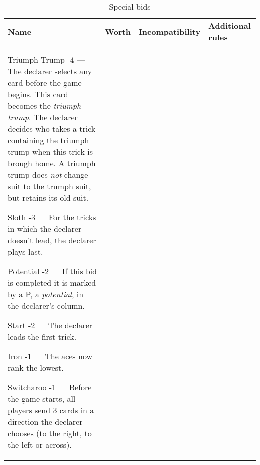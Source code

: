 %
%
%
%

\newcommand{\nonTrump}{\textnormal{non-trump bids}}

\begin{table}
	\caption{Special bids}\label{tab:specialBids}
	\begin{center}
		\begin{tabularx}{\textwidth}{
			l
			S[table-number-alignment=center, table-figures-decimal=0]
			p{3cm}
			|X
		}
			\textbf{Name} &
			\textbf{Worth} &
			\textbf{Incompatibility} &
			\textbf{Additional rules}
			\\[-3ex]

			\specialBidItem%
			{Triumph Trump}
			{-4}
			{---}
			{%
				The declarer selects any card before the game begins. This card becomes the \emph{triumph trump}. The declarer decides who takes a trick containing the triumph trump when this trick is brough home. A triumph trump does \emph{not} change suit to the trumph suit, but retains its old suit.
			}

			\specialBidItem%
			{Sloth}
			{-3}
			{---}
			{%
				For the tricks in which the declarer doesn't lead, the declarer plays last.
			}

			\specialBidItem%
			{Potential}
			{-2}
			{---}
			{%
				If this bid is completed it is marked by a P, a \emph{potential}, in the declarer's column.
			}

			\specialBidItem%
			{Start}
			{-2}
			{---}
			{%
				The declarer leads the first trick.
			}

			\specialBidItem%
			{Iron}
			{-1}
			{---}
			{%
				The aces now rank the lowest.
			}

			\specialBidItem%
			{Switcharoo}
			{-1}
			{---}
			{%
				Before the game starts, all players send 3 cards in a direction the declarer chooses (to the right, to the left or across).
			}


\end{tabularx}
\end{center}
\end{table}
